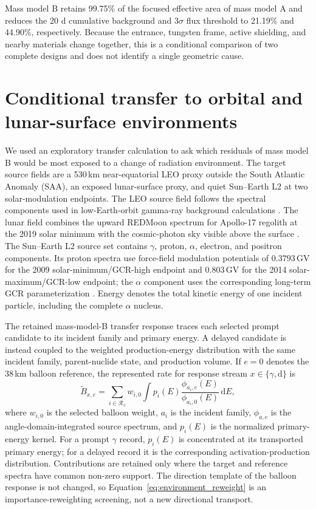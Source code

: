 \documentclass[11pt]{article}
\begin{document}
Mass model B retains 99.75\% of the focused effective area of mass model A and reduces the 20 d cumulative background and $3\sigma$ flux threshold to 21.19\% and 44.90\%, respectively. Because the entrance, tungsten frame, active shielding, and nearby materials change together, this is a conditional comparison of two complete designs and does not identify a single geometric cause.

\FloatBarrier

\section{Conditional transfer to orbital and lunar-surface environments}
\label{sec:environment_screening}

We used an exploratory transfer calculation to ask which residuals of mass
model B would be most exposed to a change of radiation environment. The target
source fields are a 530\,km near-equatorial LEO proxy outside the South
Atlantic Anomaly (SAA), an exposed lunar-surface proxy, and quiet Sun--Earth L2
at two solar-modulation endpoints. The LEO source field follows the spectral
components used in low-Earth-orbit gamma-ray background calculations
\cite{Cumani2019LEO}. The lunar field combines the upward REDMoon spectrum for
Apollo-17 regolith at the 2019 solar minimum with the cosmic-photon sky visible
above the surface \cite{Dobynde2021REDMoon}. The Sun--Earth L2 source set
contains $\gamma$, proton, $\alpha$, electron, and positron components. Its
proton spectra use force-field modulation potentials of
$0.3793$\,GV for the 2009 solar-minimum/GCR-high endpoint and $0.803$\,GV for
the 2014 solar-maximum/GCR-low endpoint; the $\alpha$ component uses the
corresponding long-term GCR parameterization
\cite{Lotti2021Athena,Usoskin2005,Kuznetsov2017}. Energy denotes the total
kinetic energy of one incident particle, including the complete $\alpha$
nucleus.

The retained mass-model-B transfer response traces each selected prompt candidate to
its incident family and primary energy. A delayed candidate is instead coupled
to the weighted production-energy distribution with the same incident family,
parent-nuclide state, and production volume. If $e=0$ denotes the 38\,km
balloon reference, the represented rate for response stream
$x\in\{\gamma,\mathrm d\}$ is
\begin{equation}
 \widetilde B_{x,e}=
 \sum_{i\in\mathcal R_x}w_{i,0}
 \int p_i(E)
 \frac{\phi_{a_i,e}(E)}{\phi_{a_i,0}(E)}
 \,\mathrm dE ,
 \label{eq:environment_reweight}
\end{equation}
where $w_{i,0}$ is the selected balloon weight, $a_i$ is the incident family,
$\phi_{a,e}$ is the angle-domain-integrated source spectrum, and $p_i(E)$ is
the normalized primary-energy kernel. For a prompt $\gamma$ record, $p_i(E)$
is concentrated at its transported primary energy; for a delayed record it is
the corresponding activation-production distribution. Contributions are
retained only where the target and reference spectra have common non-zero
support. The direction template of the balloon response is not changed, so
Equation~\eqref{eq:environment_reweight} is an importance-reweighting
screening, not a new directional transport.
\end{document}
